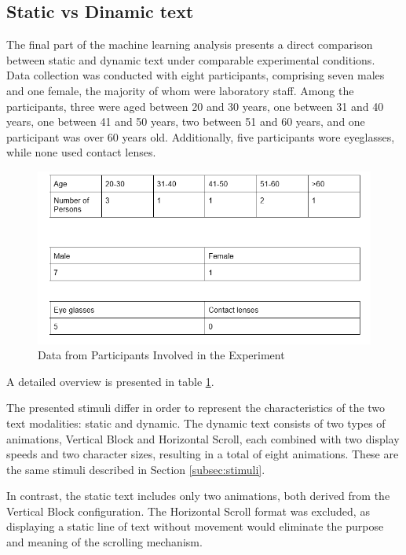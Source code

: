 \documentclass{article}
\begin{document}
\FloatBarrier

\subsection{Static vs Dinamic text}
\label{subsec:s_vs_d}

The final part of the machine learning analysis presents a direct comparison between static and dynamic text under comparable experimental conditions.
Data collection was conducted with eight participants, comprising seven males and one female, the majority of whom were laboratory staff.
Among the participants, three were aged between 20 and 30 years, one between 31 and 40 years, one between 41 and 50 years, two between 51 and 60 years, and one participant was over 60 years old.
Additionally, five participants wore eyeglasses, while none used contact lenses.

\begin{figure}[ht]
    \centering
    \includegraphics[width = 0.7
    \textwidth]{Images/Experiment/static_vs_dynamic.png}
    \caption{Data from Participants Involved in the Experiment}
    \label{fig:tester_8}
\end{figure}

A detailed overview is presented in table \ref{fig:tester_8}.

The presented stimuli differ in order to represent the characteristics of the two text modalities: static and dynamic.
The dynamic text consists of two types of animations, Vertical Block and Horizontal Scroll, each combined with two display speeds and two character sizes, resulting in a total of eight animations. 
These are the same stimuli described in Section \ref{subsec:stimuli}.

In contrast, the static text includes only two animations, both derived from the Vertical Block configuration.
The Horizontal Scroll format was excluded, as displaying a static line of text without movement would eliminate the purpose and meaning of the scrolling mechanism.
\end{document}
